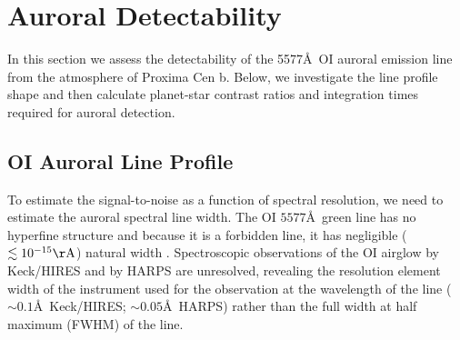 \documentclass{emulateapj}
\newcommand{\XXX}[1]{#1}      %
\begin{document}
 
\section{Auroral Detectability}
\label{sec:detect}

In this section we assess the detectability of the 5577\AA\ OI auroral emission line from the atmosphere of Proxima Cen b. Below, we investigate the line profile shape and then calculate planet-star contrast ratios and integration times required for auroral detection.

\subsection{OI Auroral Line Profile}
\label{sec:line_profile}

To estimate the signal-to-noise as a function of spectral resolution, we need to estimate the auroral spectral line width.  The OI $5577$\AA\ green line has no hyperfine structure \XXX{and because it is a forbidden line, it has negligible ($\lesssim 10^{-15}\mathrm{\AA}$) natural width} \citep{Hunten1967}.
Spectroscopic observations of the OI airglow by Keck/HIRES \citep{Slanger2001} and by HARPS \citep[][see \S\ref{sec:search}]{Anglada-Escude2016} are unresolved, revealing the resolution element width of the instrument used for the observation at the wavelength of the line (${\sim}0.1$\AA\ Keck/HIRES; ${\sim}0.05$\AA\ HARPS) rather than the full width at half maximum (FWHM) of the line.
\end{document}
